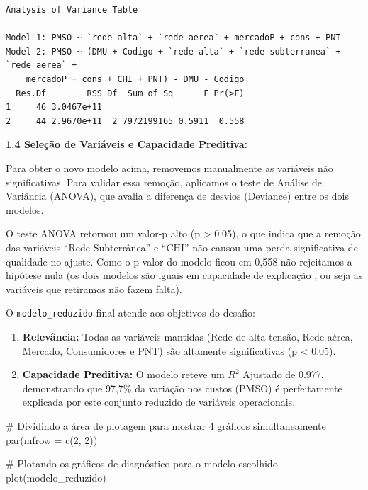 \documentclass[
  letterpaper,
]{article}
\newenvironment{Shaded}{\begin{snugshade}}{\end{snugshade}}
\newcommand{\AttributeTok}[1]{\textcolor[rgb]{0.40,0.45,0.13}{#1}}
\newcommand{\CommentTok}[1]{\textcolor[rgb]{0.37,0.37,0.37}{#1}}
\newcommand{\DecValTok}[1]{\textcolor[rgb]{0.68,0.00,0.00}{#1}}
\newcommand{\FunctionTok}[1]{\textcolor[rgb]{0.28,0.35,0.67}{#1}}
\newcommand{\NormalTok}[1]{\textcolor[rgb]{0.00,0.23,0.31}{#1}}
\begin{document}
\begin{verbatim}
Analysis of Variance Table

Model 1: PMSO ~ `rede alta` + `rede aerea` + mercadoP + cons + PNT
Model 2: PMSO ~ (DMU + Codigo + `rede alta` + `rede subterranea` + `rede aerea` + 
    mercadoP + cons + CHI + PNT) - DMU - Codigo
  Res.Df        RSS Df  Sum of Sq      F Pr(>F)
1     46 3.0467e+11                            
2     44 2.9670e+11  2 7972199165 0.5911  0.558
\end{verbatim}

\textbf{1.4 Seleção de Variáveis e Capacidade Preditiva:}

Para obter o novo modelo acima, removemos manualmente as variáveis não
significativas. Para validar essa remoção, aplicamos o teste de Análise
de Variância (ANOVA), que avalia a diferença de desvios (Deviance) entre
os dois modelos.

O teste ANOVA retornou um valor-p alto (p \textgreater{} 0.05), o que
indica que a remoção das variáveis ``Rede Subterrânea'' e ``CHI'' não
causou uma perda significativa de qualidade no ajuste. Como o p-valor do
modelo ficou em 0,558 não rejeitamos a hipótese nula (os dois modelos
são iguais em capacidade de explicação , ou seja as variáveis que
retiramos não fazem falta).

O \texttt{modelo\_reduzido} final atende aos objetivos do desafio:

\begin{enumerate}
\def\labelenumi{\arabic{enumi}.}
\item
  \textbf{Relevância:} Todas as variáveis mantidas (Rede de alta tensão,
  Rede aérea, Mercado, Consumidores e PNT) são altamente significativas
  (p \textless{} 0.05).
\item
  \textbf{Capacidade Preditiva:} O modelo reteve um \(R^2\) Ajustado de
  0.977, demonstrando que 97,7\% da variação nos custos (PMSO) é
  perfeitamente explicada por este conjunto reduzido de variáveis
  operacionais.
\end{enumerate}

\begin{Shaded}
\begin{Highlighting}[]
\CommentTok{\# Dividindo a área de plotagem para mostrar 4 gráficos simultaneamente}
\FunctionTok{par}\NormalTok{(}\AttributeTok{mfrow =} \FunctionTok{c}\NormalTok{(}\DecValTok{2}\NormalTok{, }\DecValTok{2}\NormalTok{))}

\CommentTok{\# Plotando os gráficos de diagnóstico para o modelo escolhido}
\FunctionTok{plot}\NormalTok{(modelo\_reduzido)}
\end{Highlighting}
\end{Shaded}
\end{document}
